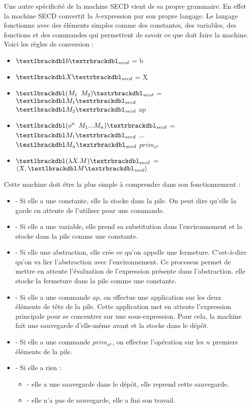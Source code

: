 \documentclass[10pt,a4paper]{report}
\begin{document}
	Une autre spécificité de la machine SECD vient de sa propre grammaire. En effet la machine SECD convertit la $\lambda$-expression par son propre langage. Le langage fonctionne avec des éléments simples comme des constantes, des variables, des fonctions et des commandes qui permettent de savoir ce que doit faire la machine. Voici les règles de conversion :
	\smallbreak
	
	\begin{itemize}
		\item[] $\textlbrackdbl b\textrbrackdbl _{secd}$ = b
		\item[] $\textlbrackdbl X\textrbrackdbl _{secd}$ = X
		\item[] $\textlbrackdbl (M_{1}$ $M_{2})\textrbrackdbl _{secd}$ = $\textlbrackdbl M_{1}\textrbrackdbl _{secd}$ $\textlbrackdbl M_{2}\textrbrackdbl _{secd}$ ap
		\item[] $\textlbrackdbl (o^{n}$ $M_{1}...M_{n})\textrbrackdbl _{secd}$ = $\textlbrackdbl M_{1}\textrbrackdbl _{secd}$ $...$ $\textlbrackdbl M_{n}\textrbrackdbl _{secd}$ $prim_{o^{n}}$
		\item[]  $\textlbrackdbl(\lambda X.M)\textrbrackdbl _{secd}$ =  $\langle X,\textlbrackdbl M\textrbrackdbl _{secd}\rangle$
	\end{itemize}
	\bigbreak
	
	
	Cette machine doit être la plus simple à comprendre dans son fonctionnement :
	\begin{itemize}
		\item[] - Si elle a une constante, elle la stocke dans la pile. On peut dire qu'elle la garde en attente de l'utiliser pour une commande. 
		\item[] - Si elle a une variable, elle prend sa substitution dans l'environnement et la stocke dans la pile comme une constante.
		\item[] - Si elle une abstraction, elle crée ce qu'on appelle une fermeture. C'est-à-dire qu'on va lier l'abstraction avec l'environnement. Ce processus permet de mettre en attente l'évaluation de l'expression présente dans l'abstraction. elle stocke la fermeture dans la pile comme une constante.
		\item[] - Si elle a une commande $ap$, on effectue une application sur les deux éléments de tête de la pile. Cette application met en attente l'expression principale pour se concentrer sur une sous-expression. Pour cela, la machine fait une sauvegarde d'elle-même avant et la stocke dans le dépôt.
		\item[] - Si elle a une commande $prim_{o^{n}}$, on effectue l'opération sur les $n$ premiers éléments de la pile.
		\item[] - Si elle a rien :
		\begin{itemize}
			\item[] - elle a une sauvegarde dans le dépôt, elle reprend cette sauvegarde.
			\item[] - elle n'a pas de sauvegarde, elle a fini son travail.
		\end{itemize}
	\end{itemize}
	\bigbreak
	
\end{document}
